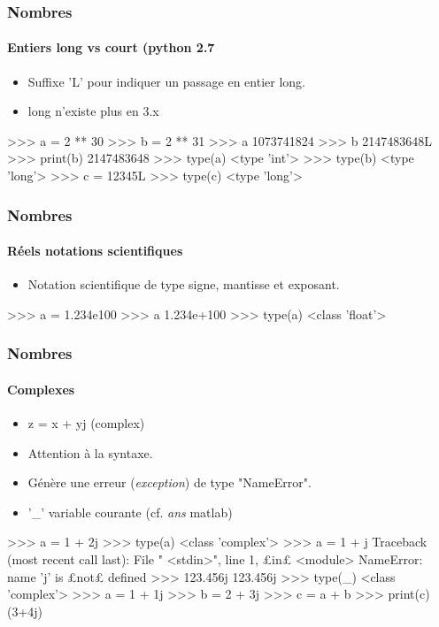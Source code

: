 \begin{frame}[fragile]
\frametitle{Nombres}
\framesubtitle{Entiers long vs court (python 2.7}
\begin{itemize}
 \item Suffixe 'L' pour indiquer un passage en entier long. 
 \item long n'existe plus en 3.x
\end{itemize}
\begin{pythonConsole}
>>> a = 2 ** 30
>>> b = 2 ** 31
>>> a
1073741824
>>> b
2147483648L
>>> print(b)
2147483648
>>> type(a)
<type 'int'>
>>> type(b)
<type 'long'>
>>> c = 12345L
>>> type(c)
<type 'long'>
\end{pythonConsole}
\end{frame}
\begin{frame}[fragile]
\frametitle{Nombres}
\framesubtitle{Réels notations scientifiques}
\begin{itemize}
 \item Notation scientifique de type signe, mantisse et exposant. 
\end{itemize}
\begin{pythonConsole}
>>> a = 1.234e100
>>> a
1.234e+100
>>> type(a)
<class 'float'>
\end{pythonConsole}
\end{frame}
\begin{frame}[fragile]
\frametitle{Nombres}
\framesubtitle{Complexes}
\begin{itemize}
 \item z = x + yj (complex)
 \item Attention à la syntaxe. 
 \item Génère une erreur (\emph{exception}) de type "NameError". 
 \item '\_' variable courante (cf. \emph{ans} matlab) 
\end{itemize}
\begin{pythonConsole}
>>> a = 1 + 2j
>>> type(a)
<class 'complex'>
>>> a = 1 + j
Traceback (most recent call last):
  File " <stdin>", line 1, £in£ <module>
NameError: name 'j' is £not£ defined
>>> 123.456j
123.456j
>>> type(_)
<class 'complex'>
>>> a = 1 + 1j
>>> b = 2 + 3j
>>> c = a + b
>>> print(c)
(3+4j)
\end{pythonConsole}
\end{frame}
